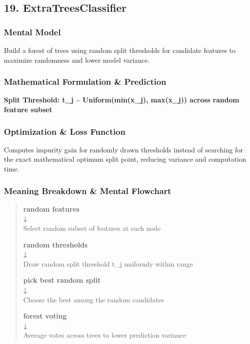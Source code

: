 \documentclass[
  10pt,
  letterpaper,
]{article}
\begin{document}
\hypertarget{extratreesclassifier}{%
\subsection{19. ExtraTreesClassifier}\label{extratreesclassifier}}

\hypertarget{mental-model-18}{%
\subsubsection{Mental Model}\label{mental-model-18}}

Build a forest of trees using random split thresholds for candidate features to maximize randomness and lower model variance.

\hypertarget{mathematical-formulation-prediction-18}{%
\subsubsection{Mathematical Formulation \& Prediction}\label{mathematical-formulation-prediction-18}}

\textbf{Split Threshold: t\_j \textasciitilde{} Uniform(min(x\_j), max(x\_j)) across random feature subset}

\hypertarget{optimization-loss-function-18}{%
\subsubsection{Optimization \& Loss Function}\label{optimization-loss-function-18}}

Computes impurity gain for randomly drawn thresholds instead of searching for the exact mathematical optimum split point, reducing variance and computation time.

\hypertarget{meaning-breakdown-mental-flowchart-18}{%
\subsubsection{Meaning Breakdown \& Mental Flowchart}\label{meaning-breakdown-mental-flowchart-18}}

\begin{quote}
\textbf{random features\\
↓\\
}Select random subset of features at each node

\textbf{random thresholds\\
↓\\
}Draw random split threshold t\_j uniformly within range

\textbf{pick best random split\\
↓\\
}Choose the best among the random candidates

\textbf{forest voting\\
↓\\
}Average votes across trees to lower prediction variance
\end{quote}
\end{document}
